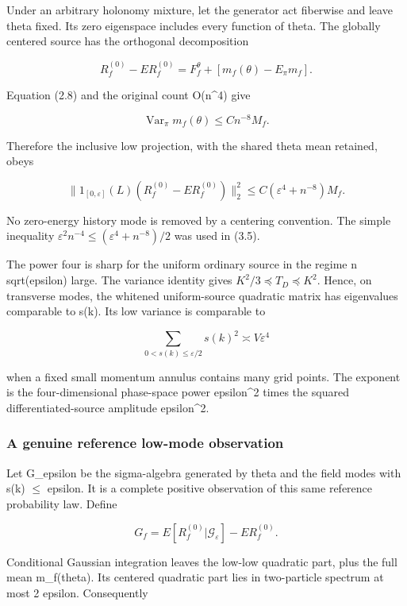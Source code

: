 \documentclass[
  11pt,
]{article}
\begin{document}
Under an arbitrary holonomy mixture, let the generator act fiberwise and
leave theta fixed. Its zero eigenspace includes every function of theta.
The globally centered source has the orthogonal decomposition

\[
 R_f^{(0)}-ER_f^{(0)}
 =F_f^{\theta}+[m_f(\theta)-E_\pi m_f].
\]

Equation (2.8) and the original count O(n\^{}4) give

\[
 \operatorname{Var}_\pi m_f(\theta)\le Cn^{-8}M_f.
\tag{3.4}
\]

Therefore the inclusive low projection, with the shared theta mean
retained, obeys

\[
 \boxed{\quad
 \|1_{[0,\varepsilon]}(L)
          (R_f^{(0)}-ER_f^{(0)})\|_2^2
 \le C(\varepsilon^4+n^{-8})M_f.
 \quad}
\tag{3.5}
\]

No zero-energy history mode is removed by a centering convention. The
simple inequality \(\varepsilon^2n^{-4}\le(\varepsilon^4+n^{-8})/2\) was
used in (3.5).

The power four is sharp for the uniform ordinary source in the regime n
sqrt(epsilon) large. The variance identity gives \(K^2/3\preceq T_D\preceq K^2\).
Hence, on transverse modes, the whitened uniform-source quadratic matrix
has eigenvalues comparable to s(k). Its low variance is comparable to

\[
 \sum_{0<s(k)\le\varepsilon/2}s(k)^2
 \asymp V\varepsilon^4
\]

when a fixed small momentum annulus contains many grid points. The
exponent is the four-dimensional phase-space power epsilon\^{}2 times
the squared differentiated-source amplitude epsilon\^{}2.

\hypertarget{a-genuine-reference-low-mode-observation}{%
\subsubsection{A genuine reference low-mode
observation}\label{a-genuine-reference-low-mode-observation}}

Let G\_epsilon be the sigma-algebra generated by theta and the field
modes with s(k) \(\leq\) epsilon. It is a complete positive observation
of this same reference probability law. Define

\[
 G_f=E[R_f^{(0)}|\mathcal G_\varepsilon]-ER_f^{(0)}.
\]

Conditional Gaussian integration leaves the low-low quadratic part, plus
the full mean m\_f(theta). Its centered quadratic part lies in
two-particle spectrum at most 2 epsilon. Consequently
\end{document}
